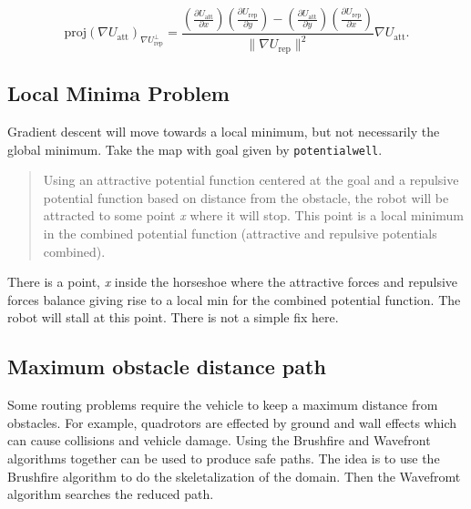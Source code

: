\[\mbox{proj}(\nabla U_\text{att})_{\nabla U_\text{rep}^{\perp}} =
\displaystyle \frac{\left(\frac{\partial U_\text{att}}{\partial x}\right)\left(\frac{\partial U_\text{rep}}{\partial y}\right)- \left(\frac{\partial U_\text{att}}{\partial y}\right)\left(\frac{\partial U_\text{rep}}{\partial x}\right) }
{ \| \nabla U_\text{rep}\|^2} \nabla U_\text{att} .\]

\hypertarget{local-minima-problem}{%
\subsection{Local Minima Problem}\label{local-minima-problem}}

Gradient descent will move towards a local minimum, but not necessarily
the global minimum. Take the map with goal given by
\texttt{potentialwell}.

\begin{quote}
Using an attractive potential function centered at the goal and a
repulsive potential function based on distance from the obstacle, the
robot will be attracted to some point \emph{x} where it will stop. This
point is a local minimum in the combined potential function (attractive
and repulsive potentials combined).
\end{quote}

There is a point, \emph{x} inside the horseshoe where the attractive
forces and repulsive forces balance giving rise to a local min for the
combined potential function. The robot will stall at this point. There
is not a simple fix here.

\hypertarget{maximum-obstacle-distance-path}{%
\subsection{Maximum obstacle distance
path}\label{maximum-obstacle-distance-path}}

Some routing problems require the vehicle to keep a maximum distance
from obstacles. For example, quadrotors are effected by ground and wall
effects which can cause collisions and vehicle damage. Using the
Brushfire and Wavefront algorithms together can be used to produce safe
paths. The idea is to use the Brushfire algorithm to do the
skeletalization of the domain. Then the Wavefromt algorithm searches the
reduced path.

